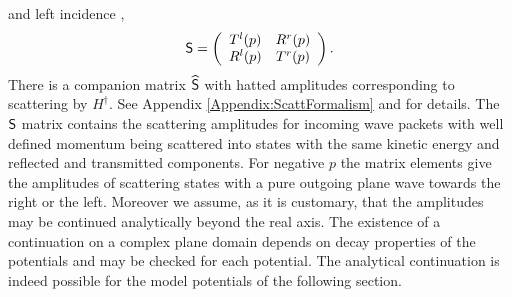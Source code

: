 and left incidence \cite{Muga2004},
%
\begin{equation}
\sf{S}=\left(\begin{array}{cc}
T^l(p)&R^r(p)
\\
R^l(p)&T^r(p)
\end{array}\right).
\end{equation}
%
There is a companion matrix $\widehat{\sf{S}}$ with hatted amplitudes corresponding to scattering by $H^{\dagger}$. See Appendix \ref{Appendix:ScattFormalism} and \cite{Muga2004} for details. The $\sf{S}$ matrix contains the scattering amplitudes for incoming wave packets with well defined momentum being scattered into states with the same kinetic energy and reflected and transmitted components.
%
For negative $p$ the matrix elements give the amplitudes of scattering states with a pure outgoing plane wave towards the right or the left.
Moreover we assume, as it is customary,
that the amplitudes may be continued analytically beyond the real axis.
The existence of a continuation on a complex plane domain depends on decay properties of the potentials and may
be checked for each potential.
The analytical continuation is indeed possible for the model potentials of the following section.



